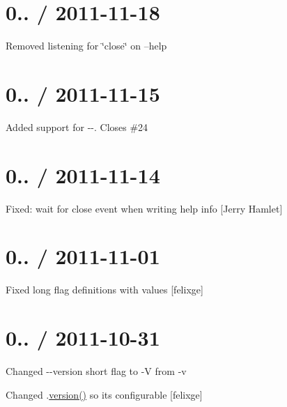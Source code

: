 \section*{0.. / 2011-\/11-\/18 }


\begin{DoxyItemize}
\item Removed listening for \char`\"{}close\char`\"{} on --help
\end{DoxyItemize}

\section*{0.. / 2011-\/11-\/15 }


\begin{DoxyItemize}
\item Added support for {\ttfamily -\/-\/}. Closes \#24
\end{DoxyItemize}

\section*{0.. / 2011-\/11-\/14 }


\begin{DoxyItemize}
\item Fixed\+: wait for close event when writing help info \mbox{[}Jerry Hamlet\mbox{]}
\end{DoxyItemize}

\section*{0.. / 2011-\/11-\/01 }


\begin{DoxyItemize}
\item Fixed long flag definitions with values \mbox{[}felixge\mbox{]}
\end{DoxyItemize}

\section*{0.. / 2011-\/10-\/31 }


\begin{DoxyItemize}
\item Changed {\ttfamily -\/-\/version} short flag to {\ttfamily -\/V} from {\ttfamily -\/v}
\item Changed {\ttfamily .\mbox{\hyperlink{namespacesetup_a2aa722b36a933088812b50ea79b97a5c}{version()}}} so it\textquotesingle{}s configurable \mbox{[}felixge\mbox{]}
\end{DoxyItemize}

